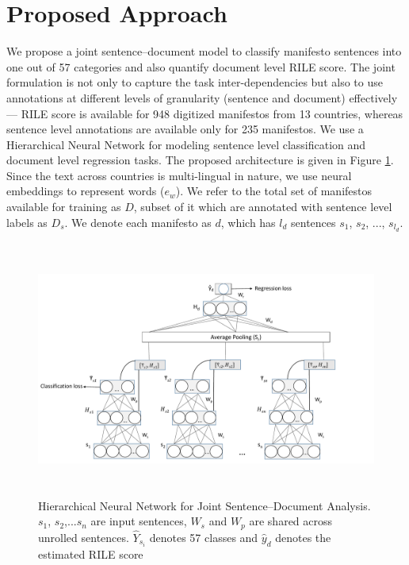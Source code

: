 \documentclass[11pt,a4paper]{article}
\begin{document}
\section{Proposed Approach}
We propose a joint sentence--document model to classify manifesto sentences into one out of 57 categories and also quantify document level RILE score. The joint formulation is not only to capture the task inter-dependencies but also to use annotations at different levels of granularity (sentence and document) effectively --- RILE score is available for 948 digitized manifestos from 13 countries, whereas sentence level annotations are available only for 235 manifestos. We use a Hierarchical Neural Network for modeling sentence level classification and document level regression tasks. The proposed architecture is given in Figure \ref{fig:HNN}. Since the text across countries is multi-lingual in nature, we use neural embeddings to represent words ($e_{w}$). We refer to the total set of manifestos available for training as $D$, subset of it which are annotated with sentence level labels as $D_{s}$. We denote each manifesto as $d$, which has $l_{d}$ sentences $s_{1}$, $s_{2}$, ..., $s_{l_{d}}$. 


\begin{figure}[!ht]
\centering
\includegraphics[height=8.4cm, scale=1.4]{ALTA_Model.pdf}
\caption{Hierarchical Neural Network for Joint Sentence--Document Analysis. $s_{1}$, $s_{2}$,...$s_{n}$ are input sentences, $W_{s}$ and $W_{p}$ are shared across unrolled sentences. $\hat{Y}_{s_{i}}$ denotes  57 classes and $\hat{y}_{d}$ denotes the estimated RILE score}
 \label{fig:HNN}
 \end{figure}
\end{document}
